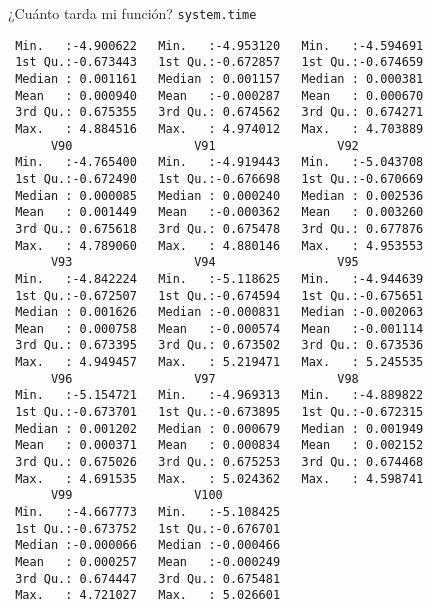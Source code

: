 \documentclass[xcolor={usenames,svgnames,dvipsnames}]{beamer}
\begin{document}
\begin{frame}[label={sec:orga833b1a},fragile]{¿Cuánto tarda mi función? \texttt{system.time}}
\begin{verbatim}
 Min.   :-4.900622   Min.   :-4.953120   Min.   :-4.594691  
 1st Qu.:-0.673443   1st Qu.:-0.672857   1st Qu.:-0.674659  
 Median : 0.001161   Median : 0.001157   Median : 0.000381  
 Mean   : 0.000940   Mean   :-0.000287   Mean   : 0.000670  
 3rd Qu.: 0.675355   3rd Qu.: 0.674562   3rd Qu.: 0.674271  
 Max.   : 4.884516   Max.   : 4.974012   Max.   : 4.703889  
      V90                 V91                 V92           
 Min.   :-4.765400   Min.   :-4.919443   Min.   :-5.043708  
 1st Qu.:-0.672490   1st Qu.:-0.676698   1st Qu.:-0.670669  
 Median : 0.000085   Median : 0.000240   Median : 0.002536  
 Mean   : 0.001449   Mean   :-0.000362   Mean   : 0.003260  
 3rd Qu.: 0.675618   3rd Qu.: 0.675478   3rd Qu.: 0.677876  
 Max.   : 4.789060   Max.   : 4.880146   Max.   : 4.953553  
      V93                 V94                 V95           
 Min.   :-4.842224   Min.   :-5.118625   Min.   :-4.944639  
 1st Qu.:-0.672507   1st Qu.:-0.674594   1st Qu.:-0.675651  
 Median : 0.001626   Median :-0.000831   Median :-0.002063  
 Mean   : 0.000758   Mean   :-0.000574   Mean   :-0.001114  
 3rd Qu.: 0.673395   3rd Qu.: 0.673502   3rd Qu.: 0.673536  
 Max.   : 4.949457   Max.   : 5.219471   Max.   : 5.245535  
      V96                 V97                 V98           
 Min.   :-5.154721   Min.   :-4.969313   Min.   :-4.889822  
 1st Qu.:-0.673701   1st Qu.:-0.673895   1st Qu.:-0.672315  
 Median : 0.001202   Median : 0.000679   Median : 0.001949  
 Mean   : 0.000371   Mean   : 0.000834   Mean   : 0.002152  
 3rd Qu.: 0.675026   3rd Qu.: 0.675253   3rd Qu.: 0.674468  
 Max.   : 4.691535   Max.   : 5.024362   Max.   : 4.598741  
      V99                 V100          
 Min.   :-4.667773   Min.   :-5.108425  
 1st Qu.:-0.673752   1st Qu.:-0.676701  
 Median :-0.000066   Median :-0.000466  
 Mean   : 0.000257   Mean   :-0.000249  
 3rd Qu.: 0.674447   3rd Qu.: 0.675481  
 Max.   : 4.721027   Max.   : 5.026601
\end{verbatim}
\end{frame}
\end{document}
